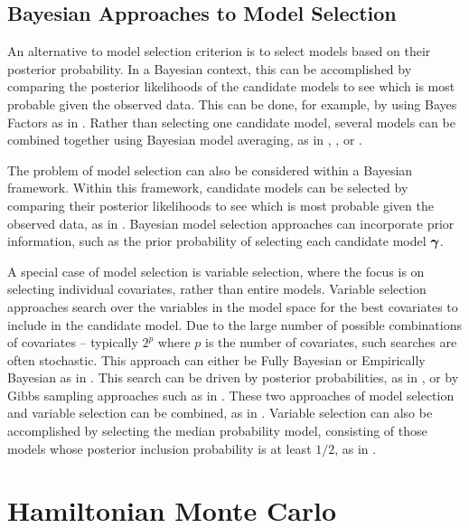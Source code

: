 \documentclass{amsart}[12pt]
\begin{document}
\subsection{Bayesian Approaches to Model Selection}
An alternative to model selection criterion is to select models based on their posterior probability. In a
Bayesian context, this can be accomplished by comparing the posterior likelihoods of the candidate models to
see which is most probable given the observed data. This can be done, for example, by using Bayes Factors as
in \citep{Kass1993}. Rather than selecting one candidate model, several models can be combined together using
Bayesian model averaging, as in \citep{Hoeting1999}, \citep{Raftery1997}, \citep{Fernandez2001} or
\citep{Papaspiliopoulos2016}.

The problem of model selection can also be considered within a Bayesian framework.
Within this framework, candidate models can be selected by comparing their posterior likelihoods to see
which is most probable given the observed data, as in \citep{Kass1993}. Bayesian model selection approaches
can incorporate prior information, such as the prior probability of selecting each candidate model ${\boldsymbol \gamma}$.

A special case of model selection is variable selection, where the focus is on selecting individual
covariates, rather than entire models. Variable selection approaches search over the
variables in the model space for the best covariates to include in the candidate model. Due to the large
number of possible combinations of covariates -- typically $2^p$ where $p$ is the number of covariates, such
searches are often stochastic. This approach can either be Fully Bayesian or Empirically Bayesian as in
\citep{Cui2008}.  This search can be driven by posterior probabilities, as in \citep{Casella2006}, or by Gibbs
sampling approaches such as in \citep{George1993}. These two approaches of model selection and variable
selection can be combined, as in \citep{Geweke1996}. Variable selection can also be accomplished by selecting
the median probability model, consisting of those models whose posterior inclusion probability is at least
$1/2$, as in \citep{Barbieri2004}.

\section{Hamiltonian Monte Carlo}

\end{document}
